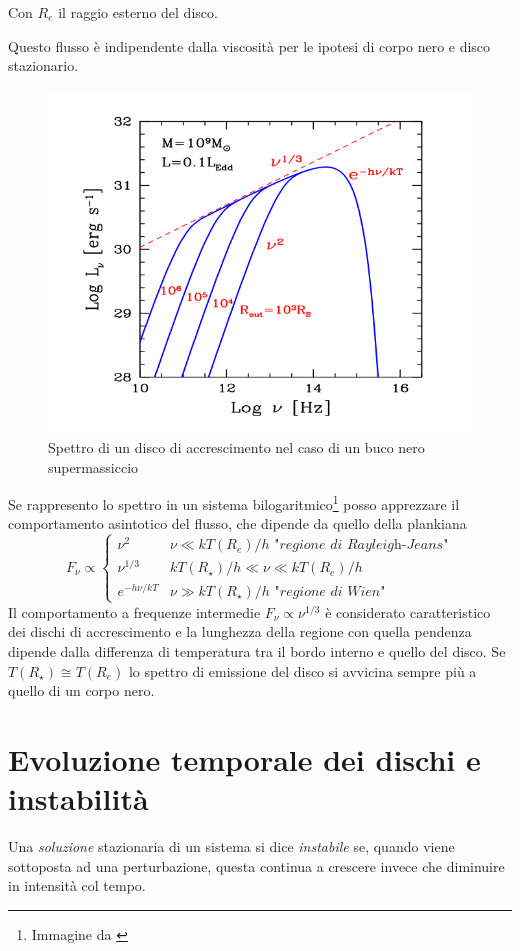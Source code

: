 \documentclass[a4paperbi]{article}
\begin{document}
	Con $R_e$ il raggio esterno del disco.
	
	Questo flusso è indipendente dalla viscosità per le ipotesi di corpo nero e disco stazionario.
	
	\begin{figure}[H]
		\centering
		\includegraphics[width=0.7\linewidth]{SpettroDiscoGhisellini}
		\caption{Spettro di un disco di accrescimento nel caso di un buco nero supermassiccio}
		\label{fig:SpettroDiscoGhisellini}
	\end{figure}	

	Se rappresento lo spettro in un sistema bilogaritmico\footnote{Immagine da \cite{GhiselliniRadiativi}} posso apprezzare il comportamento asintotico del flusso, che dipende da quello della plankiana
	\begin{equation}
		F_\nu\propto\begin{cases}
						\nu^2 & \nu\ll kT(R_{e})/h \textit{ "regione di Rayleigh-Jeans"}\\
						\nu^{1/3} & kT(R_{\star})/h\ll\nu\ll kT(R_{e})/h\\
						e^{-h\nu/kT} & \nu\gg kT(R_{\star})/h \textit{ "regione di Wien"}						
					\end{cases}
	\end{equation}
	Il comportamento a frequenze intermedie $F_\nu\propto\nu^{1/3}$ è considerato caratteristico dei dischi di accrescimento e la lunghezza della regione con quella pendenza dipende dalla differenza di temperatura tra il bordo interno e quello del disco. Se $T(R_{\star})\cong T(R_{e})$ lo spettro di emissione del disco si avvicina sempre più a quello di un corpo nero.
		
\newpage
\section{Evoluzione temporale dei dischi e instabilità}
	Una \textit{soluzione} stazionaria di un sistema si dice \textit{instabile} se, quando viene sottoposta ad una perturbazione, questa continua a crescere invece che diminuire in intensità col tempo.
\end{document}
